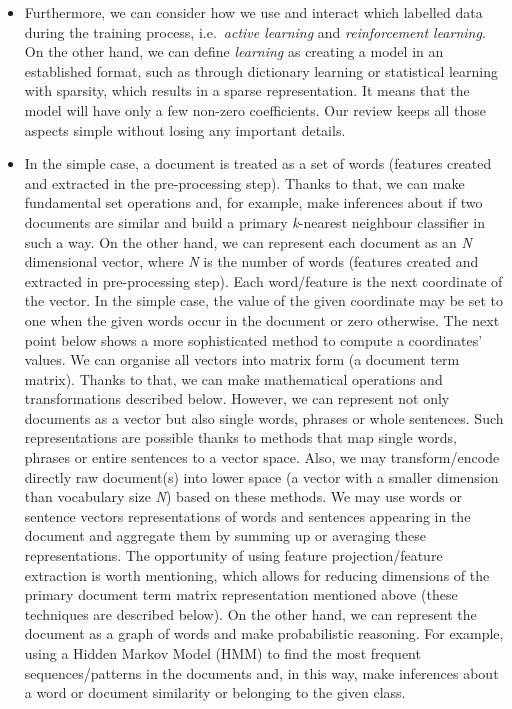 \documentclass[
]{article}
\begin{document}
\begin{itemize}
\item
  Furthermore, we can consider how we use and interact which labelled data during the training process, i.e.~\emph{active learning} and \emph{reinforcement learning}. On the other hand, we can define \emph{learning} as creating a model in an established format, such as through dictionary learning or statistical learning with sparsity, which results in a sparse representation. It means that the model will have only a few non-zero coefficients. Our review keeps all those aspects simple without losing any important details.
\item
  In the simple case, a document is treated as a set of words (features created and extracted in the pre-processing step). Thanks to that, we can make fundamental set operations and, for example, make inferences about if two documents are similar and build a primary \emph{k}-nearest neighbour classifier in such a way. On the other hand, we can represent each document as an \emph{N} dimensional vector, where \emph{N} is the number of words (features created and extracted in pre-processing step). Each word/feature is the next coordinate of the vector. In the simple case, the value of the given coordinate may be set to one when the given words occur in the document or zero otherwise. The next point below shows a more sophisticated method to compute a coordinates' values. We can organise all vectors into matrix form (a document term matrix). Thanks to that, we can make mathematical operations and transformations described below. However, we can represent not only documents as a vector but also single words, phrases or whole sentences. Such representations are possible thanks to methods that map single words, phrases or entire sentences to a vector space. Also, we may transform/encode directly raw document(s) into lower space (a vector with a smaller dimension than vocabulary size \emph{N}) based on these methods. We may use words or sentence vectors representations of words and sentences appearing in the document and aggregate them by summing up or averaging these representations. The opportunity of using feature projection/feature extraction is worth mentioning, which allows for reducing dimensions of the primary document term matrix representation mentioned above (these techniques are described below). On the other hand, we can represent the document as a graph of words and make probabilistic reasoning. For example, using a Hidden Markov Model (HMM) to find the most frequent sequences/patterns in the documents and, in this way, make inferences about a word or document similarity or belonging to the given class.

\end{itemize}
\end{document}
